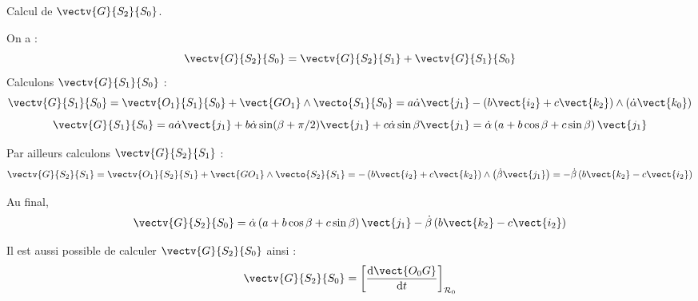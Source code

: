 \begin{multicols}{2}
\begin{corrige}
\end{corrige}\else \fi

%
%
%
%
\ifprof
\begin{corrige}

Calcul de $\vectv{G}{S_2}{S_0}$.

On a : 
$$\vectv{G}{S_2}{S_0} = \vectv{G}{S_2}{S_1} + \vectv{G}{S_1}{S_0} $$
Calculons $\vectv{G}{S_1}{S_0}$ :
$$
\vectv{G}{S_1}{S_0} 
= \vectv{O_1}{S_1}{S_0} + \vect{GO_1}\wedge\vecto{S_1}{S_0}
= a\dot{\alpha}\vect{j_1} - \left(b\vect{i_2} + c\vect{k_2}\right) \wedge\left( \dot{\alpha} \vect{k_0}\right)
$$
$$
\vectv{G}{S_1}{S_0} 
= a\dot{\alpha}\vect{j_1}  + b\dot{\alpha} \sin(\beta+\pi/2) \vect{j_1} + c \dot{\alpha}\sin\beta\vect{j_1}
= \dot{\alpha} \left(a+b \cos\beta + c \sin\beta\right) \vect{j_1} 
$$

Par ailleurs calculons $\vectv{G}{S_2}{S_1}$ :
$$\vectv{G}{S_2}{S_1} = \vectv{O_1}{S_2}{S_1} + \vect{GO_1}\wedge \vecto{S_2}{S_1}
=-\left(b\vect{i_2}+c\vect{k_2}\right) \wedge \left(\dot{\beta}\vect{j_1}\right)
=-\dot{\beta}\left(b\vect{k_2}-c\vect{i_2} \right)
$$

Au final, 
$$\vectv{G}{S_2}{S_0} = \dot{\alpha} \left(a+b \cos\beta + c \sin\beta\right) \vect{j_1} 
-\dot{\beta}\left(b\vect{k_2}-c\vect{i_2} \right)
$$

Il est aussi possible de calculer $\vectv{G}{S_2}{S_0}$ ainsi : 
$$\vectv{G}{S_2}{S_0} = \left[\dfrac{\text{d} \vect{O_0G}}{\text{d}t}\right]_{\mathcal{R}_0}$$ 

\end{corrige}\else \fi





\ifprof
\else
\end{multicols}
\fi


